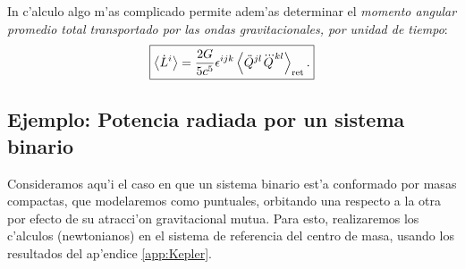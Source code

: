 In c'alculo algo m'as complicado \cite{Maggiore} permite adem'as determinar el \textit{momento angular promedio total transportado por las ondas gravitacionales, por unidad de tiempo}:
\begin{equation}\label{eqfinal}
\boxed{\left\langle\dot{L}^{i}\right\rangle=\frac{2G}{5c^{5}}\epsilon^{ijk} \left\langle\ddot{Q}^{jl}\dddot{Q}^{kl}\right\rangle_{\rm ret}.}
\end{equation}
\subsection{Ejemplo: Potencia radiada por un sistema binario}
Consideramos aqu'i el caso en que un sistema binario est'a conformado por masas compactas, que modelaremos como puntuales, orbitando una respecto a la otra por efecto de su atracci'on gravitacional mutua. Para esto, realizaremos los c'alculos (newtonianos) en el sistema de referencia del centro de masa, usando los resultados del ap'endice \ref{app:Kepler}.

